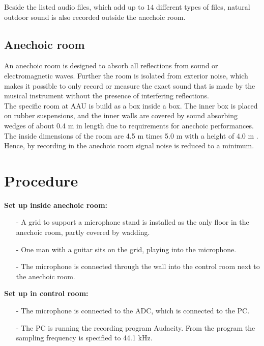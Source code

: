 Beside the listed audio files, which add up to $14$ different types of files, natural outdoor sound is also recorded outside the anechoic room.

\subsection{Anechoic room} 
An anechoic room is designed to absorb all reflections from sound or electromagnetic waves. Further the room is isolated from exterior noise, which makes it possible to only record or measure the exact sound that is made by the musical instrument without the presence of interfering reflections. \\ The specific room at AAU is build as a box inside a box. The inner box is placed on rubber suspensions, and the inner walls are covered by sound absorbing wedges of about 0.4 m in length due to requirements for anechoic performances. The inside dimensions of the room are 4.5 m times 5.0 m with a height of 4.0 m \cite{anechoic}.\\
Hence, by recording in the anechoic room signal noise is reduced to a minimum.

\section{Procedure}
\textbf{Set up inside anechoic room:}\\
\begin{itemize}
\item[-] A grid to support a microphone stand is installed as the only floor in the anechoic room, partly covered by wadding. 
\item[-] One man with a guitar sits on the grid, playing into the microphone. 
\item[-] The microphone is connected through the wall into the control room next to the anechoic room. 
\end{itemize}   
\textbf{Set up in control room: }
\begin{itemize}
\item[-] The microphone is connected to the ADC, which is connected to the PC.
\item[-] The PC is running the recording program Audacity. From the program the sampling frequency is specified to 44.1 kHz.     
\end{itemize}


